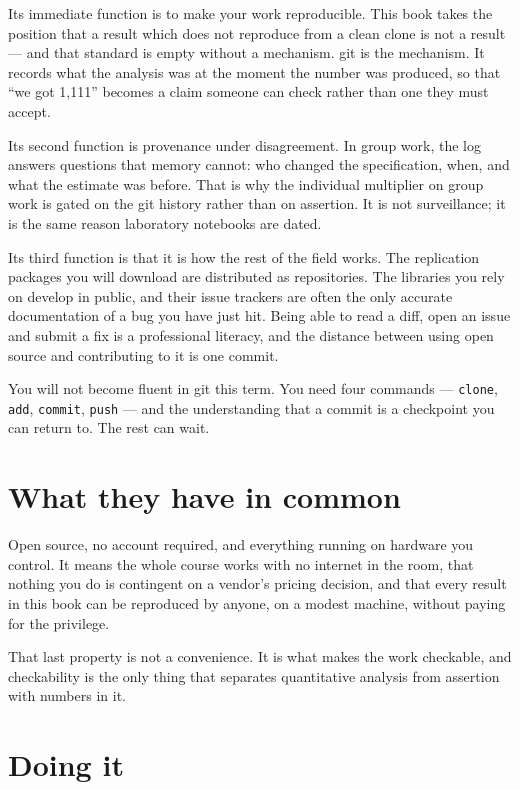 \documentclass[
  letterpaper,
  10pt,
  twoside,
  openright,
  numbers=noenddot,
  chapterprefix=true]{scrbook}
\begin{document}
Its immediate function is to make your work reproducible. This book
takes the position that a result which does not reproduce from a clean
clone is not a result --- and that standard is empty without a
mechanism. git is the mechanism. It records what the analysis was at the
moment the number was produced, so that ``we got 1,111'' becomes a claim
someone can check rather than one they must accept.

Its second function is provenance under disagreement. In group work, the
log answers questions that memory cannot: who changed the specification,
when, and what the estimate was before. That is why the individual
multiplier on group work is gated on the git history rather than on
assertion. It is not surveillance; it is the same reason laboratory
notebooks are dated.

Its third function is that it is how the rest of the field works. The
replication packages you will download are distributed as repositories.
The libraries you rely on develop in public, and their issue trackers
are often the only accurate documentation of a bug you have just hit.
Being able to read a diff, open an issue and submit a fix is a
professional literacy, and the distance between using open source and
contributing to it is one commit.

You will not become fluent in git this term. You need four commands ---
\texttt{clone}, \texttt{add}, \texttt{commit}, \texttt{push} --- and the
understanding that a commit is a checkpoint you can return to. The rest
can wait.

\section{What they have in common}\label{what-they-have-in-common}

Open source, no account required, and everything running on hardware you
control. It means the whole course works with no internet in the room,
that nothing you do is contingent on a vendor's pricing decision, and
that every result in this book can be reproduced by anyone, on a modest
machine, without paying for the privilege.

That last property is not a convenience. It is what makes the work
checkable, and checkability is the only thing that separates
quantitative analysis from assertion with numbers in it.

\section{Doing it}\label{doing-it}
\end{document}
